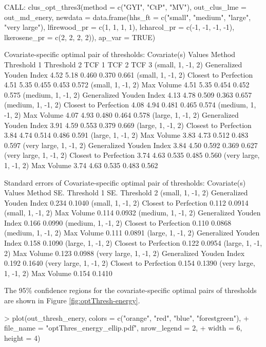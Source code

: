 {\begin{example}
CALL: clus_opt_thres3(method = c("GYI", "CtP", "MV"), out_clus_lme = out_md_enery, 
    newdata = data.frame(hhs_ft = c("small", "medium", "large", 
        "very large"), lfirewood_pr = c(1, 1, 1, 1), lcharcol_pr = c(-1, 
        -1, -1, -1), lkerosene_pr = c(2, 2, 2, 2)), ap_var = TRUE)
 
Covariate-specific optimal pair of thresholds: 
    Covariate(s) Values                   Method Threshold 1 Threshold 2 TCF 1 TCF 2 TCF 3
      (small, 1, -1, 2) Generalized Youden Index        4.52        5.18 0.460 0.370 0.661
      (small, 1, -1, 2)    Closest to Perfection        4.51        5.35 0.455 0.453 0.572
      (small, 1, -1, 2)               Max Volume        4.51        5.35 0.454 0.452 0.575
     (medium, 1, -1, 2) Generalized Youden Index        4.13        4.78 0.509 0.363 0.657
     (medium, 1, -1, 2)    Closest to Perfection        4.08        4.94 0.481 0.465 0.574
     (medium, 1, -1, 2)               Max Volume        4.07        4.93 0.480 0.464 0.578
      (large, 1, -1, 2) Generalized Youden Index        3.91        4.59 0.553 0.379 0.669
      (large, 1, -1, 2)    Closest to Perfection        3.84        4.74 0.514 0.486 0.591
      (large, 1, -1, 2)               Max Volume        3.83        4.73 0.512 0.483 0.597
 (very large, 1, -1, 2) Generalized Youden Index        3.84        4.50 0.592 0.369 0.627
 (very large, 1, -1, 2)    Closest to Perfection        3.74        4.63 0.535 0.485 0.560
 (very large, 1, -1, 2)               Max Volume        3.74        4.63 0.535 0.483 0.562

Standard errors of Covariate-specific optimal pair of thresholds: 
    Covariate(s) Values                   Method SE. Threshold 1 SE. Threshold 2
      (small, 1, -1, 2) Generalized Youden Index           0.234          0.1040
      (small, 1, -1, 2)    Closest to Perfection           0.112          0.0914
      (small, 1, -1, 2)               Max Volume           0.114          0.0932
     (medium, 1, -1, 2) Generalized Youden Index           0.166          0.0990
     (medium, 1, -1, 2)    Closest to Perfection           0.110          0.0868
     (medium, 1, -1, 2)               Max Volume           0.111          0.0891
      (large, 1, -1, 2) Generalized Youden Index           0.158          0.1090
      (large, 1, -1, 2)    Closest to Perfection           0.122          0.0954
      (large, 1, -1, 2)               Max Volume           0.123          0.0988
 (very large, 1, -1, 2) Generalized Youden Index           0.192          0.1640
 (very large, 1, -1, 2)    Closest to Perfection           0.154          0.1390
 (very large, 1, -1, 2)               Max Volume           0.154          0.1410
\end{example}
The 95\% confidence regions for the covariate-specific optimal pairs of thresholds are shown in Figure \ref{fig:optThresh-energy}.
\begin{example}
> plot(out_thresh_enery, colors = c("orange", "red", "blue", "forestgreen"), 
+      file_name = "optThres_energy_ellip.pdf", nrow_legend = 2, 
+      width = 6, height = 4)
\end{example}

}
